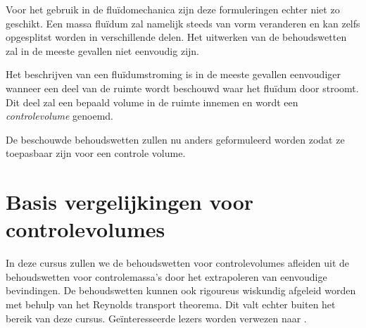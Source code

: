Voor het gebruik in de fluïdomechanica zijn deze formuleringen echter niet zo geschikt. Een massa fluïdum zal namelijk steeds van vorm veranderen en kan zelfs opgesplitst worden in verschillende delen. Het uitwerken van de behoudswetten zal in de meeste gevallen niet eenvoudig zijn.

Het beschrijven van een fluïdumstroming is in de meeste gevallen eenvoudiger wanneer een deel van de ruimte wordt beschouwd waar het fluïdum door stroomt. Dit deel zal een bepaald volume in de ruimte innemen en wordt een \emph{controlevolume} genoemd.

De beschouwde behoudswetten zullen nu anders geformuleerd worden zodat ze toepasbaar zijn voor een controle volume.

	\section{Basis vergelijkingen voor controlevolumes}
	\label{sec:Basis vergelijkingen voor controlevolumes}
In deze cursus zullen we de behoudswetten voor controlevolumes afleiden uit de behoudswetten voor controlemassa's door het extrapoleren van eenvoudige bevindingen. De behoudswetten kunnen ook rigoureus wiskundig afgeleid worden met behulp van het Reynolds transport theorema. Dit valt echter buiten het bereik van deze cursus. Geïnteresseerde lezers worden verwezen naar \cite{Schobeiri2010}.

